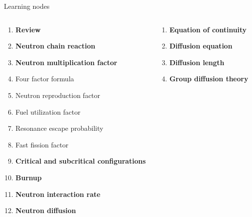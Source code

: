 \documentclass[aspectratio=1610,pdftex,dvipsnames,compress,xcolor={dvipsnames}]{beamer}
\begin{document}
\begin{frame}{Learning nodes}
    \begin{columns}[t]

        \begin{column}{0.50\textwidth}
            \begin{enumerate}[series=outerlist,topsep=0pt,itemsep=1pt,leftmargin=*,label=(\arabic*)]
                \item[]\textbf{Review}
                    \vspace{0.10in}
                \item[]\textbf{Neutron chain reaction}
                    \vspace{0.10in}
                \item[]\textbf{Neutron multiplication factor}
                \item[]Four factor formula
                \item[]Neutron reproduction factor
                \item[]Fuel utilization factor
                \item[]Resonance escape probability
                \item[]Fast fission factor
                    \vspace{0.10in}
                \item[]\textbf{Critical and subcritical configurations}
                    \vspace{0.10in}
                \item[]\textbf{Burnup}
                    \vspace{0.10in}
                \item[]\textbf{Neutron interaction rate}
                    \vspace{0.10in}
                \item[]\textbf{Neutron diffusion}
            \end{enumerate}
        \end{column}

        \begin{column}{0.50\textwidth}
            \begin{enumerate}[series=outerlist,topsep=0pt,itemsep=1pt,leftmargin=*,label=(\arabic*)]
                \item[]\hfill\textbf{Equation of continuity}
                    \vspace{0.10in}
                \item[]\hfill\textbf{Diffusion equation}
                    \vspace{0.10in}
                \item[]\hfill\textbf{Diffusion length}
                    \vspace{0.10in}
                \item[]\hfill\textbf{Group diffusion theory}
            \end{enumerate}
        \end{column}

    \end{columns}
\end{frame}
\end{document}
